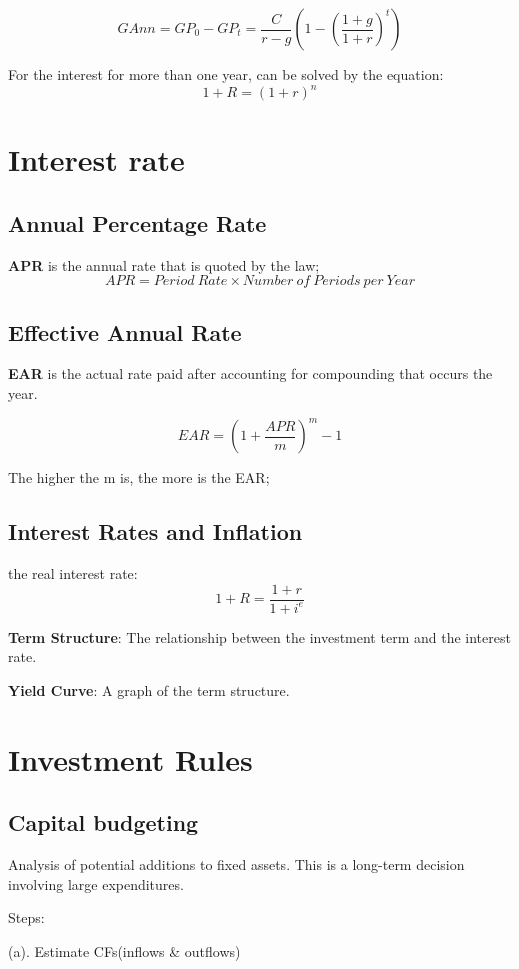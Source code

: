 \documentclass[10pt, a4paper]{article}
\begin{document}
        $$GAnn = GP_0 - GP_t = \frac{C}{r - g}(1 - (\frac{1 + g}{1 + r})^t)$$

        For the interest for more than one year, can be solved by the equation:
        $$1 + R = (1 + r) ^ n$$

\section{Interest rate}
    \subsection{Annual Percentage Rate}
        \textbf{APR} is the annual rate that is quoted by the law; 
            $$APR = Period\ Rate \times Number\ of\ Periods\ per\ Year$$
    \subsection{Effective Annual Rate}
        \textbf{EAR} is the actual rate paid after accounting for compounding that occurs the year.
        
        $$EAR = (1 + \frac{APR}{m})^m - 1$$

        The higher the m is, the more is the EAR; 

    \subsection{Interest Rates and Inflation}
        the real interest rate:
        $$1 + R = \frac{1 + r}{1 + i^e}$$

        \textbf{Term Structure}: The relationship between the investment term and the interest rate.

        \textbf{Yield Curve}: A graph of the term structure.

    \section{Investment Rules}
        \subsection{Capital budgeting}
            Analysis of potential additions to fixed assets. This is a long-term decision involving large expenditures.
            
            Steps:

            \quad(a). Estimate CFs(inflows \& outflows)
            
\end{document}

